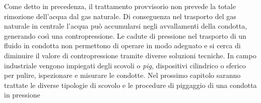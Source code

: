 Come detto in precedenza, il trattamento provvisorio non prevede la totale rimozione dell'acqua dal gas naturale. Di conseguenza nel trasporto del gas naturale in centrale l'acqua può accumularsi negli avvallamenti della condotta, generando così una contropressione. Le cadute di pressione nel trasporto di un fluido in condotta non permettono di operare in modo adeguato e si cerca di diminuire il valore di contropressione tramite diverse soluzioni tecniche. In campo industriale vengono impiegati degli scovoli o \textit{pig}, dispositivi cilindrico o sferico per pulire, ispezionare e misurare le condotte. Nel prossimo capitolo saranno trattate le diverse tipologie di scovolo e le procedure di piggaggio di una condotta in pressione